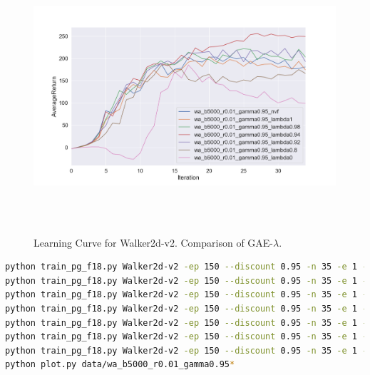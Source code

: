 \documentclass[12pt]{article}
\begin{document}
\begin{figure}[H]
  \centering
  \includegraphics[height=4in]{bonus.png}
  \caption{Learning Curve for Walker2d-v2. Comparison of GAE-$\lambda$.}
\end{figure}
\begin{lstlisting}[language=bash]
python train_pg_f18.py Walker2d-v2 -ep 150 --discount 0.95 -n 35 -e 1 --seed 1 -l 2 -s 32 -b 5000 -lr 0.01 -rtg --exp_name wa_b5000_r0.01_gamma0.95_nvf
python train_pg_f18.py Walker2d-v2 -ep 150 --discount 0.95 -n 35 -e 1 --seed 1 -l 2 -s 32 -b 5000 -lr 0.01 -rtg --nn_baseline --exp_name wa_b5000_r0.01_gamma0.95_lambda1
python train_pg_f18.py Walker2d-v2 -ep 150 --discount 0.95 -n 35 -e 1 --seed 1 -l 2 -s 32 -b 5000 -lr 0.01 -rtg --nn_baseline --gae --gae_lambda 0.98 --exp_name  wa_b5000_r0.01_gamma0.95_lambda0.98
python train_pg_f18.py Walker2d-v2 -ep 150 --discount 0.95 -n 35 -e 1 --seed 1 -l 2 -s 32 -b 5000 -lr 0.01 -rtg --nn_baseline --gae --gae_lambda 0.94 --exp_name  wa_b5000_r0.01_gamma0.95_lambda0.94
python train_pg_f18.py Walker2d-v2 -ep 150 --discount 0.95 -n 35 -e 1 --seed 1 -l 2 -s 32 -b 5000 -lr 0.01 -rtg --nn_baseline --gae --gae_lambda 0.92 --exp_name  wa_b5000_r0.01_gamma0.95_lambda0.92
python train_pg_f18.py Walker2d-v2 -ep 150 --discount 0.95 -n 35 -e 1 --seed 1 -l 2 -s 32 -b 5000 -lr 0.01 -rtg --nn_baseline --gae --gae_lambda 0.8 --exp_name  wa_b5000_r0.01_gamma0.95_lambda0.8
python train_pg_f18.py Walker2d-v2 -ep 150 --discount 0.95 -n 35 -e 1 --seed 1 -l 2 -s 32 -b 5000 -lr 0.01 -rtg --nn_baseline --gae --gae_lambda 0 --exp_name  wa_b5000_r0.01_gamma0.95_lambda0
python plot.py data/wa_b5000_r0.01_gamma0.95*
\end{lstlisting}
\end{document}
